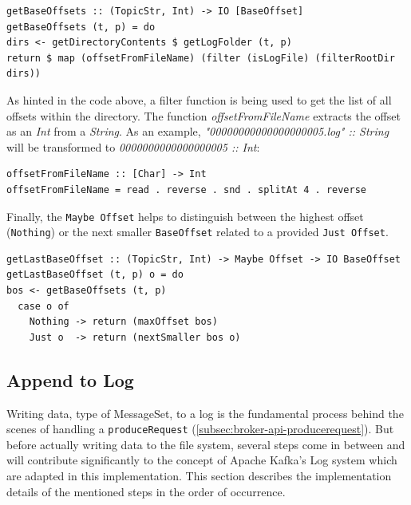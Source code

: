 \begin{lstlisting}[caption={Determining all base offsets for given topic and partition}]
getBaseOffsets :: (TopicStr, Int) -> IO [BaseOffset]
getBaseOffsets (t, p) = do
dirs <- getDirectoryContents $ getLogFolder (t, p)
return $ map (offsetFromFileName) (filter (isLogFile) (filterRootDir dirs))
\end{lstlisting}

As hinted in the code above, a filter function is being used to get the list of
all offsets within the directory. The function \textit{offsetFromFileName}
extracts the offset as an \textit{Int} from a \textit{String}. As an example,
\textit{"00000000000000000005.log" :: String } will be transformed to
\textit{0000000000000000005 :: Int}:

\begin{lstlisting}[caption={Get numeric value (offset) from given string (filename)}]
offsetFromFileName :: [Char] -> Int
offsetFromFileName = read . reverse . snd . splitAt 4 . reverse
\end{lstlisting}

Finally, the \lstinline{Maybe Offset} helps to distinguish between the highest offset
(\lstinline{Nothing}) or the next smaller \lstinline{BaseOffset} related to a provided
\lstinline{Just Offset}. 

\begin{lstlisting}[caption={Get highest base offset existing of given topic and partition}]
getLastBaseOffset :: (TopicStr, Int) -> Maybe Offset -> IO BaseOffset
getLastBaseOffset (t, p) o = do
bos <- getBaseOffsets (t, p)
  case o of
    Nothing -> return (maxOffset bos)
    Just o  -> return (nextSmaller bos o)
\end{lstlisting}

\subsection{Append to Log}
\label{subsec:broker-log-append}

Writing data, type of MessageSet, to a log is the fundamental process behind the
scenes of handling a \lstinline{produceRequest}
(\ref{subsec:broker-api-producerequest}). But before actually writing data
to the file system, several steps come in between and will contribute
significantly to the concept of Apache Kafka's Log system which are adapted in
this implementation. This section describes the implementation details of the
mentioned steps in the order of occurrence.

